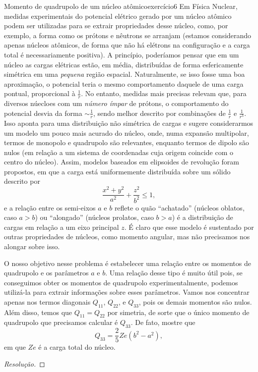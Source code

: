 \begin{exercício}{Momento de quadrupolo de um núcleo atômico}{exercício6}
    Em Física Nuclear, medidas experimentais do potencial elétrico gerado por um núcleo atômico podem ser utilizadas para se extrair propriedades desse núcleo, como, por exemplo, a forma como os prótons e nêutrons se arranjam (estamos considerando apenas núcleos atômicos, de forma que não há elétrons na configuração e a carga total é necessariamente positiva). A princípio, poderíamos pensar que em um núcleo as cargas elétricas estão, em média, distribuídas de forma esfericamente simétrica em uma \emph{pequena} região espacial. Naturalmente, se isso fosse uma boa aproximação, o potencial teria o mesmo comportamento daquele de uma carga pontual, proporcional à \(\frac1r\). No entanto, medidas mais precisas relevam que, para diversos núecloes com um \emph{número ímpar} de prótons, o comportamento do potencial desvia da forma \(\sim\frac1r\), sendo melhor descrito por combinações de \(\frac1r\) e \(\frac1{r^3}\). Isso aponta para uma distribuição não simétrica de cargas e sugere considerarmos um modelo um pouco mais acurado do núcleo, onde, numa expansão multipolar, termos de monopolo e quadrupolo são relevantes, enquanto termos de dipolo são nulos (em relação a um sistema de coordenadas cuja origem coincide com o centro do núcleo). Assim, modelos baseados em elipsoides de revolução foram propostos, em que a carga está uniformemente distribuída sobre um sólido descrito por
    \begin{equation*}
        \frac{x^2 + y^2}{a^2} + \frac{z^2}{b^2} \leq 1,
    \end{equation*}
    e a relação entre os semi-eixos \(a\) e \(b\) reflete o quão \enquote{achatado} (núcleos oblatos, caso \(a > b\)) ou \enquote{alongado} (núcleos prolatos, caso \(b > a\)) é a distribuição de cargas em relação a um eixo principal \(z\). É claro que esse modelo é sustentado por outras propriedades de núcleos, como momento angular, mas não precisamos nos alongar sobre isso.

    O nosso objetivo nesse problema é estabelecer uma relação entre os momentos de quadrupolo e os parâmetros \(a\) e \(b\). Uma relação desse tipo é muito útil pois, se conseguimos obter os momentos de quadrupolo experimentalmente, podemos utilizá-la para extrair informações sobre esses parâmetros. Vamos nos concentrar apenas nos termos diagonais \(Q_{11}\), \(Q_{22}\), e \(Q_{33}\), pois os demais momentos são nulos. Além disso, temos que \(Q_{11} = Q_{22}\) por simetria, de sorte que o único momento de quadrupolo que precisamos calcular é \(Q_{33}\). De fato, mostre que
    \begin{equation*}
        Q_{33} = \frac25 Z e(b^2 - a^2),
    \end{equation*}
    em que \(Ze\) é a carga total do núcleo.
\end{exercício}
\begin{proof}[Resolução]

\end{proof}
